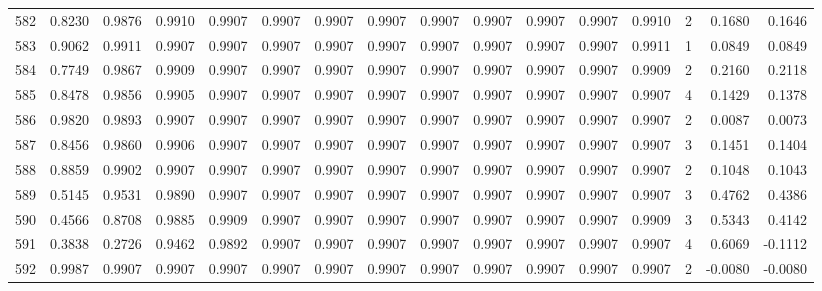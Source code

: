 \begin{tabular}{lrrrrrrrrrrrrrrr}
582 &      0.8230 &  0.9876 &  0.9910 &  0.9907 &  0.9907 &  0.9907 &  0.9907 &  0.9907 &  0.9907 &  0.9907 &   0.9907 &     0.9910 &      2 &                    0.1680 &                     0.1646 \\
583 &      0.9062 &  0.9911 &  0.9907 &  0.9907 &  0.9907 &  0.9907 &  0.9907 &  0.9907 &  0.9907 &  0.9907 &   0.9907 &     0.9911 &      1 &                    0.0849 &                     0.0849 \\
584 &      0.7749 &  0.9867 &  0.9909 &  0.9907 &  0.9907 &  0.9907 &  0.9907 &  0.9907 &  0.9907 &  0.9907 &   0.9907 &     0.9909 &      2 &                    0.2160 &                     0.2118 \\
585 &      0.8478 &  0.9856 &  0.9905 &  0.9907 &  0.9907 &  0.9907 &  0.9907 &  0.9907 &  0.9907 &  0.9907 &   0.9907 &     0.9907 &      4 &                    0.1429 &                     0.1378 \\
586 &      0.9820 &  0.9893 &  0.9907 &  0.9907 &  0.9907 &  0.9907 &  0.9907 &  0.9907 &  0.9907 &  0.9907 &   0.9907 &     0.9907 &      2 &                    0.0087 &                     0.0073 \\
587 &      0.8456 &  0.9860 &  0.9906 &  0.9907 &  0.9907 &  0.9907 &  0.9907 &  0.9907 &  0.9907 &  0.9907 &   0.9907 &     0.9907 &      3 &                    0.1451 &                     0.1404 \\
588 &      0.8859 &  0.9902 &  0.9907 &  0.9907 &  0.9907 &  0.9907 &  0.9907 &  0.9907 &  0.9907 &  0.9907 &   0.9907 &     0.9907 &      2 &                    0.1048 &                     0.1043 \\
589 &      0.5145 &  0.9531 &  0.9890 &  0.9907 &  0.9907 &  0.9907 &  0.9907 &  0.9907 &  0.9907 &  0.9907 &   0.9907 &     0.9907 &      3 &                    0.4762 &                     0.4386 \\
590 &      0.4566 &  0.8708 &  0.9885 &  0.9909 &  0.9907 &  0.9907 &  0.9907 &  0.9907 &  0.9907 &  0.9907 &   0.9907 &     0.9909 &      3 &                    0.5343 &                     0.4142 \\
591 &      0.3838 &  0.2726 &  0.9462 &  0.9892 &  0.9907 &  0.9907 &  0.9907 &  0.9907 &  0.9907 &  0.9907 &   0.9907 &     0.9907 &      4 &                    0.6069 &                    -0.1112 \\
592 &      0.9987 &  0.9907 &  0.9907 &  0.9907 &  0.9907 &  0.9907 &  0.9907 &  0.9907 &  0.9907 &  0.9907 &   0.9907 &     0.9907 &      2 &                   -0.0080 &                    -0.0080 \\

\end{tabular}
